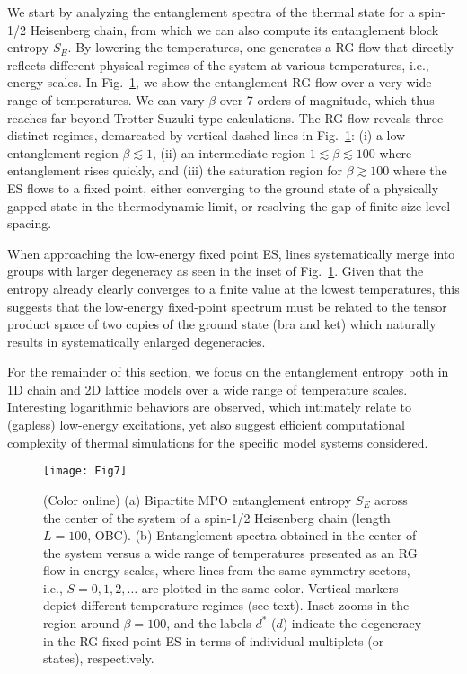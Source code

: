 \documentclass[aps,prx,twocolumn,showpacs,psfig,superscriptaddress,longbibliography]{revtex4-1}
\newcommand{\Fig}[1]{Fig.~\ref{#1}}
\begin{document}
We start by analyzing the entanglement spectra of the thermal state
for a spin-1/2 Heisenberg chain, from which we can also compute its
 entanglement block entropy $S_E$.  By lowering the temperatures,
 one generates a RG flow that directly reflects different physical
 regimes of the system at various temperatures, i.e., energy scales.
%
In Fig.~\ref{Fig:EntRGFlow}, we show the entanglement RG flow over a
very wide range of temperatures.  We can vary $\beta$ over 7 orders
of magnitude, which thus reaches far beyond Trotter-Suzuki type
calculations.
%
The RG flow reveals three distinct regimes, demarcated by vertical
dashed lines in \Fig{Fig:EntRGFlow}: (i) a low entanglement region
$\beta \lesssim  1$, (ii) an intermediate region $1 \lesssim \beta
\lesssim 100$ where entanglement rises quickly, and (iii) the
saturation region for $\beta \gtrsim100$ where the ES flows to a
fixed point, either converging to the ground state of a physically
gapped state in the thermodynamic limit, or resolving the gap of
finite size level spacing.

When approaching the low-energy fixed point ES, lines systematically
merge into groups with larger degeneracy as seen in the inset of
\Fig{Fig:EntRGFlow}. Given that the entropy already clearly
converges to a finite value at the lowest temperatures, this
suggests that the low-energy fixed-point spectrum must be related to
the tensor product space of two copies of the ground state (bra and
ket) which naturally results in systematically enlarged
degeneracies.

For the remainder of this section, we focus on the entanglement
entropy both in 1D chain and 2D lattice models over a wide range of
temperature scales.  Interesting logarithmic behaviors are observed,
which intimately relate to (gapless) low-energy excitations, yet
also suggest efficient computational complexity of thermal
simulations for the specific model systems considered.

\begin{figure}[tbp]
\texttt{[image: Fig7]}
\caption{(Color online)
   (a) Bipartite MPO entanglement entropy $S_E$ across the
   center of the system of a spin-1/2 Heisenberg chain
   (length $L=100$, OBC).  (b) Entanglement spectra obtained
   in the center of the system versus a wide range of
   temperatures presented as an RG flow in energy scales,
   where lines from the same symmetry sectors, i.e., $S=0 ,1,
   2, \ldots$ are plotted in the same color.  Vertical
   markers depict different temperature regimes (see text).
   Inset zooms in the region around $\beta=100$, and the
   labels $d^\ast$ ($d$) indicate the degeneracy in the RG
   fixed point ES in terms of individual multiplets (or
   states), respectively.
}
\label{Fig:EntRGFlow}
\end{figure}
\end{document}
